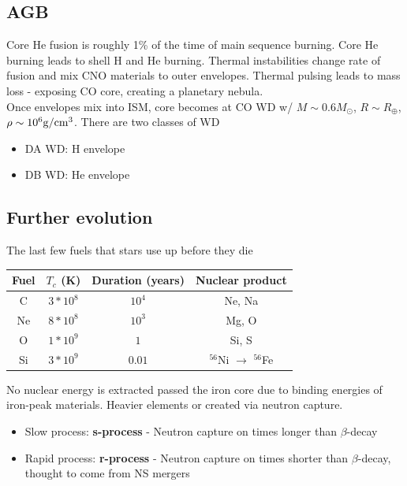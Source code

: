 \documentclass{article}
\begin{document}
\subsection{AGB}

Core He fusion is roughly 1\% of the time of main sequence burning. Core He burning leads to shell H and He burning. Thermal instabilities change rate of fusion and mix CNO materials to outer envelopes. Thermal pulsing leads to mass loss - exposing CO core, creating a planetary nebula.\\

Once envelopes mix into ISM, core becomes at CO WD w/ $M \sim 0.6 M_\odot$, $R \sim R_\oplus$, $\rho \sim 10^6 {\rm g/cm^3}$. There are two classes of WD

\begin{itemize}
    \item DA WD: H envelope
    \item DB WD: He envelope
\end{itemize}

\subsection{Further evolution}
The last few fuels that stars use up before they die

\begin{table}[h]
    \centering
    \begin{tabular}{c|c|c|c}
        Fuel & $T_c$ (K) & Duration (years) & Nuclear product \\
        \hline
        C & $3*10^8$ & $10^4$ & Ne, Na \\
        \hline
        Ne & $8*10^8$ & $10^3$ & Mg, O\\
        \hline
        O & $1*10^9$ & $1$ & Si, S\\
        \hline
        Si & $3*10^9$ & $0.01$ & $^{56}$Ni $\to$ $^{56}$Fe
        
    \end{tabular}
    \label{tab:placeholder}
\end{table}

No nuclear energy is extracted passed the iron core due to binding energies of iron-peak materials. Heavier elements or created via neutron capture.

\begin{itemize}
    \item Slow process: \textbf{s-process} - Neutron capture on times longer than $\beta$-decay
    \item Rapid process: \textbf{r-process} - Neutron capture on times shorter than $\beta$-decay, thought to come from NS mergers
\end{itemize}
\end{document}
